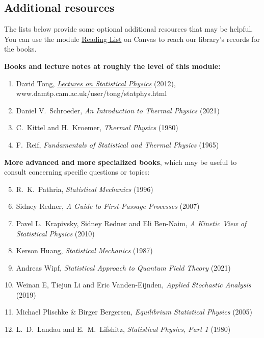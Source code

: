 \subsection*{Additional resources}
The lists below provide some optional additional resources that may be helpful.
You can use the module \href{https://liverpool.instructure.com/courses/60601/external_tools/102}{Reading List} on Canvas to reach our library's records for the books.

\noindent\textbf{Books and lecture notes at roughly the level of this module:} \\[-24 pt]
\begin{enumerate}
  \item David Tong, \href{https://www.damtp.cam.ac.uk/user/tong/statphys.html}{\textit{Lectures on Statistical Physics}} (2012), \\ www.damtp.cam.ac.uk/user/tong/statphys.html
  \item Daniel V.~Schroeder, \textit{An Introduction to Thermal Physics} (2021)
  \item C.~Kittel and H.~Kroemer, \textit{Thermal Physics} (1980)
  \item F.~Reif, \textit{Fundamentals of Statistical and Thermal Physics} (1965)
\end{enumerate}

\noindent\textbf{More advanced and more specialized books}, which may be useful to consult concerning specific questions or topics: \\[-24 pt]
\begin{enumerate}
  \setcounter{enumi}{4}
  \item R.~K.~Pathria, \textit{Statistical Mechanics} (1996)
  \item Sidney Redner, \textit{A Guide to First-Passage Processes} (2007)
  \item Pavel L.~Krapivsky, Sidney Redner and Eli Ben-Naim, \textit{A Kinetic View of Statistical Physics} (2010)
  \item Kerson Huang, \textit{Statistical Mechanics} (1987)
  \item Andreas Wipf, \textit{Statistical Approach to Quantum Field Theory} (2021)
  \item Weinan E, Tiejun Li and Eric Vanden-Eijnden, \textit{Applied Stochastic Analysis} (2019)
  \item Michael Plischke \& Birger Bergersen, \textit{Equilibrium Statistical Physics} (2005)
  \item L.~D.~Landau and E.~M.~Lifshitz, \textit{Statistical Physics, Part 1} (1980)
\end{enumerate} %

